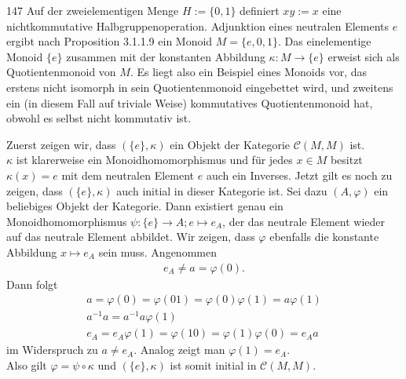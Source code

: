 \begin{algebraUE}{147}
Auf der zweielementigen Menge $H := \{0,1\}$ definiert $xy := x$ eine
nichtkommutative Halbgruppenoperation. Adjunktion eines neutralen Elements $e$
ergibt nach Proposition 3.1.1.9 ein Monoid $M = \{e,0,1\}$. Das einelementige
Monoid $\{e\}$ zusammen mit der konstanten Abbildung $\kappa: M \rightarrow \{e\}$
erweist sich als Quotientenmonoid von $M$. Es liegt also ein Beispiel eines
Monoids vor, das erstens nicht isomorph in sein Quotientenmonoid eingebettet
wird, und zweitens ein (in diesem Fall auf triviale Weise) kommutatives
Quotientenmonoid hat, obwohl es selbst nicht kommutativ ist.
\end{algebraUE}
\begin{solution}
Zuerst zeigen wir, dass $(\{e\}, \kappa)$ ein Objekt der Kategorie $\mathcal{C}(M,M)$ ist. \\
$\kappa$ ist klarerweise ein Monoidhomomorphismus und für jedes $x \in M$
besitzt $\kappa(x) = e$ mit dem neutralen Element $e$ auch ein Inverses.
Jetzt gilt es noch zu zeigen, dass $(\{e\}, \kappa)$ auch initial in dieser
Kategorie ist. Sei dazu $(A,\varphi)$ ein beliebiges Objekt der Kategorie.
Dann existiert genau ein Monoidhomomorphismus $\psi: \{e\} \rightarrow A; e \mapsto e_A$,
der das neutrale Element wieder auf das neutrale Element abbildet.
Wir zeigen, dass $\varphi$ ebenfalls die konstante Abbildung $x \mapsto e_A$
sein muss.
Angenommen
\begin{align*}
  e_A \neq a = \varphi(0).
\end{align*}
Dann folgt
\begin{align*}
  a = \varphi(0) = \varphi(01) = \varphi(0)\varphi(1) = a\varphi(1) \\
  a^{-1}a = a^{-1}a\varphi(1) \\
  e_A = e_A\varphi(1) = \varphi(10) = \varphi(1)\varphi(0) = e_Aa
\end{align*}
im Widerspruch zu $a \neq e_A$. Analog zeigt man $\varphi(1) = e_A$. \\
Also gilt $\varphi = \psi \circ \kappa$ und $(\{e\}, \kappa)$ ist somit initial
in $\mathcal{C}(M,M)$.
\end{solution}
